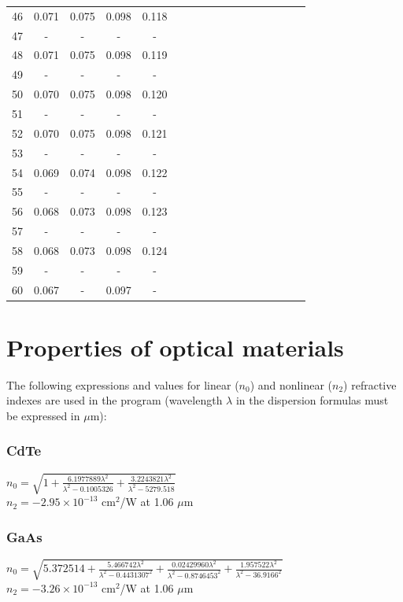 \documentclass{report}
\begin{document}
\begin{appendices}
\begin{table}
\begin{tabular}{|c|cccc|cccc|cccc|cccc|}
46 & 0.071 & 0.075 & 0.098 & 0.118 & & & & & & & & & & & &\\
47 &   -   &   -   &   -   &   -   & & & & & & & & & & & &\\
48 & 0.071 & 0.075 & 0.098 & 0.119 & & & & & & & & & & & &\\
49 &   -   &   -   &   -   &   -   & & & & & & & & & & & &\\
50 & 0.070 & 0.075 & 0.098 & 0.120 & & & & & & & & & & & &\\
51 &   -   &   -   &   -   &   -   & & & & & & & & & & & &\\
52 & 0.070 & 0.075 & 0.098 & 0.121 & & & & & & & & & & & &\\
53 &   -   &   -   &   -   &   -   & & & & & & & & & & & &\\
54 & 0.069 & 0.074 & 0.098 & 0.122 & & & & & & & & & & & &\\
55 &   -   &   -   &   -   &   -   & & & & & & & & & & & &\\
56 & 0.068 & 0.073 & 0.098 & 0.123 & & & & & & & & & & & &\\
57 &   -   &   -   &   -   &   -   & & & & & & & & & & & &\\
58 & 0.068 & 0.073 & 0.098 & 0.124 & & & & & & & & & & & &\\
59 &   -   &   -   &   -   &   -   & & & & & & & & & & & &\\
60 & 0.067 &   -   & 0.097 &   -   & & & & & & & & & & & &\\
\hline
\end{tabular}
\end{table}


\chapter{Properties of optical materials}
\label{appendix:optical_constants}
The following expressions and values for linear ($n_0$) and nonlinear ($n_2$) refractive indexes are used in the program (wavelength $\lambda$ in the dispersion formulas must be expressed in $\mu$m):

\subsection*{CdTe}
$n_0=\sqrt{1+\frac{6.1977889\lambda^2}{\lambda^2-0.1005326}+\frac{3.2243821\lambda^2}{\lambda^2-5279.518}}$ \cite{DeBell-1979}\\
$n_2 = -2.95\times 10^{-13}$ cm$^2$/W at 1.06 $\mu$m \cite{Sheik-Bahae-1991}
\subsection*{GaAs}
$n_0=\sqrt{5.372514+\frac{5.466742\lambda^2}{\lambda^2-0.4431307^2}+\frac{0.02429960\lambda^2}{\lambda^2-0.8746453^2}+\frac{1.957522\lambda^2}{\lambda^2-36.9166^2}}$ \cite{Skauli-2003}\\
$n_2 = -3.26\times 10^{-13}$ cm$^2$/W at 1.06 $\mu$m \cite{Sheik-Bahae-1991}

\end{appendices}
\end{document}
